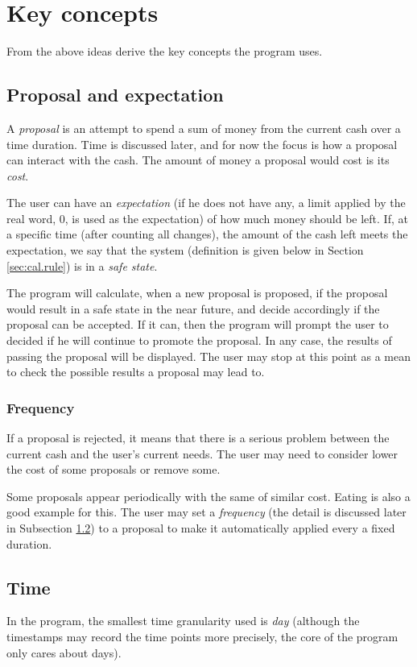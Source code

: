 \section{Key concepts}
From the above ideas derive the key concepts the program uses.

\subsection{Proposal and expectation}
A \emph{proposal} is an attempt to spend a sum of money from the current cash over a time duration. Time is discussed later, and for now the focus is how a proposal can interact with the cash. The amount of money a proposal would cost is its \emph{cost}.

The user can have an \emph{expectation} (if he does not have any, a limit applied by the real word, 0, is used as the expectation) of how much money should be left. If, at a specific time (after counting all changes), the amount of the cash left meets the expectation, we say that the system (definition is given below in Section \ref{sec:cal.rule}) is in a \emph{safe state}.

The program will calculate, when a new proposal is proposed, if the proposal would result in a safe state in the near future, and decide accordingly if the proposal can be accepted. If it can, then the program will prompt the user to decided if he will continue to promote the proposal. In any case, the results of passing the proposal will be displayed. The user may stop at this point as a mean to check the possible results a proposal may lead to.

\subsubsection{Frequency}
If a proposal is rejected, it means that there is a serious problem between the current cash and the user's current needs. The user may need to consider lower the cost of some proposals or remove some.

Some proposals appear periodically with the same of similar cost. Eating is also a good example for this. The user may set a \emph{frequency} (the detail is discussed later in Subsection \ref{subsec:key.con:time}) to a proposal to make it automatically applied every a fixed duration.

\subsection{Time} \label{subsec:key.con:time}
In the program, the smallest time granularity used is \emph{day} (although the timestamps may record the time points more precisely, the core of the program only cares about days).

